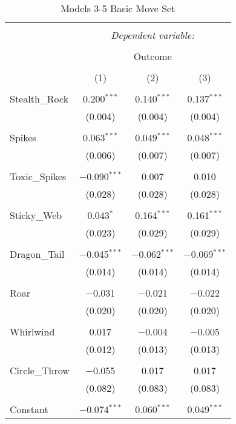 \documentclass[12pt,twoside]{reedthesis}
\begin{document}
  \begin{table}[!htbp] \centering 
    \caption{Models 3-5 Basic Move Set} 
    \label{} 
  \begin{tabular}{@{\extracolsep{5pt}}lccc} 
  \\[-1.8ex]\hline 
  \hline \\[-1.8ex] 
   & \multicolumn{3}{c}{\textit{Dependent variable:}} \\ 
  \cline{2-4} 
  \\[-1.8ex] & \multicolumn{3}{c}{Outcome} \\ 
  \\[-1.8ex] & (1) & (2) & (3)\\ 
  \hline \\[-1.8ex] 
   Stealth\_Rock & 0.200$^{***}$ & 0.140$^{***}$ & 0.137$^{***}$ \\ 
    & (0.004) & (0.004) & (0.004) \\ 
    & & & \\ 
   Spikes & 0.063$^{***}$ & 0.049$^{***}$ & 0.048$^{***}$ \\ 
    & (0.006) & (0.007) & (0.007) \\ 
    & & & \\ 
   Toxic\_Spikes & $-$0.090$^{***}$ & 0.007 & 0.010 \\ 
    & (0.028) & (0.028) & (0.028) \\ 
    & & & \\ 
   Sticky\_Web & 0.043$^{*}$ & 0.164$^{***}$ & 0.161$^{***}$ \\ 
    & (0.023) & (0.029) & (0.029) \\ 
    & & & \\ 
   Dragon\_Tail & $-$0.045$^{***}$ & $-$0.062$^{***}$ & $-$0.069$^{***}$ \\ 
    & (0.014) & (0.014) & (0.014) \\ 
    & & & \\ 
   Roar & $-$0.031 & $-$0.021 & $-$0.022 \\ 
    & (0.020) & (0.020) & (0.020) \\ 
    & & & \\ 
   Whirlwind & 0.017 & $-$0.004 & $-$0.005 \\ 
    & (0.012) & (0.013) & (0.013) \\ 
    & & & \\ 
   Circle\_Throw & $-$0.055 & 0.017 & 0.017 \\ 
    & (0.082) & (0.083) & (0.083) \\ 
    & & & \\ 
   Constant & $-$0.074$^{***}$ & 0.060$^{***}$ & 0.049$^{***}$ \\ 

\end{tabular}
\end{table}
\end{document}
